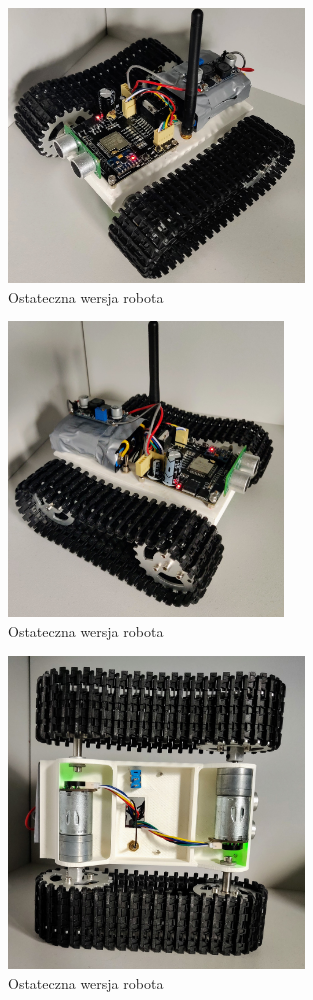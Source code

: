\documentclass[10pt, a4paper]{article}
\begin{document}
\begin{figure}[H]
	\centering
	\includegraphics[width=0.7\textwidth]{figures/final/robot2.jpg}
	\caption{Ostateczna wersja robota}
	\label{fig:robot_final2}
\end{figure}

\begin{figure}[H]
	\centering
	\includegraphics[width=0.65\textwidth]{figures/final/robot3.jpg}
	\caption{Ostateczna wersja robota}
	\label{fig:robot_final3}
\end{figure}

\begin{figure}[H]
	\centering
	\includegraphics[width=0.7\textwidth]{figures/final/robot4.jpg}
	\caption{Ostateczna wersja robota}
	\label{fig:robot_final4}
\end{figure}
\end{document}

